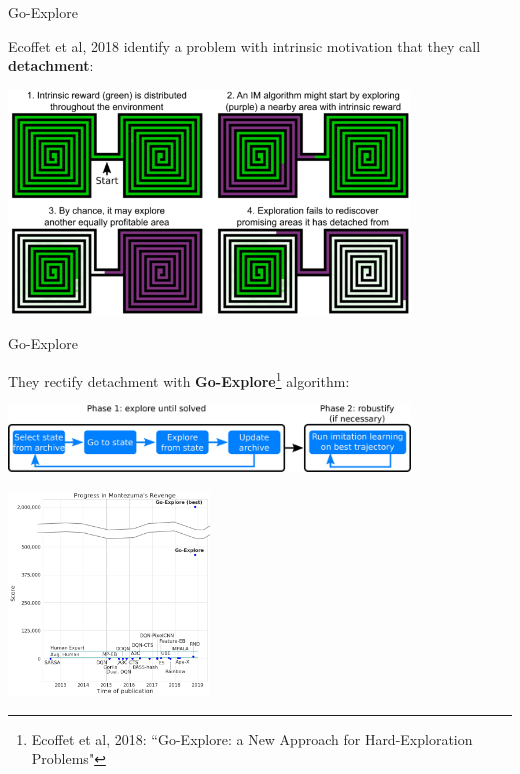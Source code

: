 \documentclass[9pt]{beamer}
\begin{document}
\begin{frame}{Go-Explore}

Ecoffet et al, 2018 identify a problem with intrinsic motivation that they call \textbf{detachment}:

\begin{center}
\includegraphics[width=0.8\textwidth]{p2-detach}
\end{center}

\end{frame}

\begin{frame}{Go-Explore}

They rectify detachment with \textbf{Go-Explore}\footnote{Ecoffet et al, 2018: ``Go-Explore: a New Approach for Hard-Exploration Problems"} algorithm:

\begin{center}
\includegraphics[width=0.8\textwidth]{p2-go-explore}

\includegraphics[width=0.4\textwidth]{p2-go-explore2}
\end{center}

\end{frame}
\end{document}
